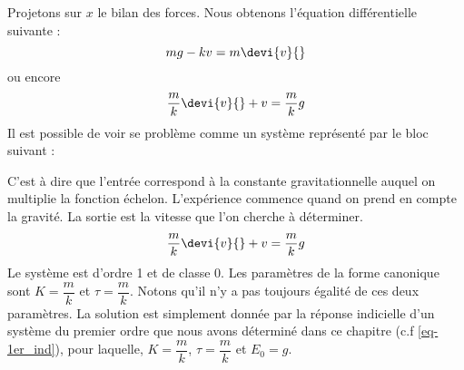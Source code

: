Projetons sur $x$ le bilan des forces. Nous obtenons l'équation différentielle 
suivante :
\[
mg-kv=m\devi{v}{}
\]
ou encore
\[
\dfrac{m}{k}\devi{v}{}+v=\dfrac{m}{k}g
\]
Il est possible de voir se problème comme un système représenté 
par le bloc suivant :
\begin{center}
    
\end{center}
C'est à dire que l'entrée correspond à la constante gravitationnelle auquel 
on multiplie la fonction échelon. L'expérience commence quand
\og on prend en compte la gravité\fg.
La sortie est la vitesse que l'on cherche à déterminer.
\[
\dfrac{m}{k}\devi{v}{}+v=\dfrac{m}{k}g
\]
Le système est d'ordre 1 et de classe 0. Les paramètres de la forme canonique 
sont $K=\dfrac{m}{k}$ et $\tau=\dfrac{m}{k}$. Notons qu'il n'y a pas toujours 
égalité de ces deux paramètres.
La solution est simplement donnée par la réponse indicielle d'un système du 
premier ordre que nous avons déterminé dans ce chapitre (c.f \cref{eq-1er_ind}),
pour laquelle, $K=\dfrac{m}{k}$, $\tau=\dfrac{m}{k}$ et $E_0=g$.

